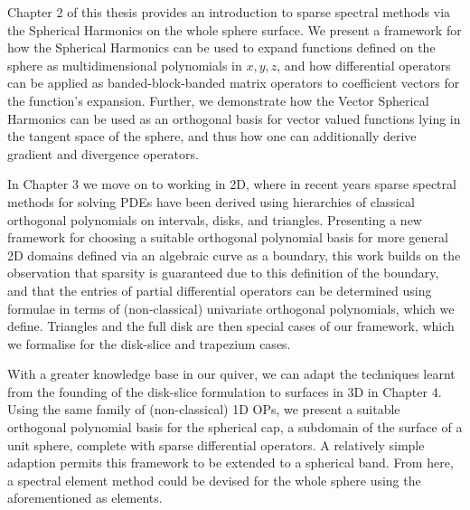 Chapter 2 of this thesis provides an introduction to sparse spectral methods via the Spherical Harmonics on the whole sphere surface. We present a framework for how the Spherical Harmonics can be used to expand functions defined on the sphere as multidimensional polynomials in $x, y, z$, and how differential operators can be applied as banded-block-banded matrix operators to coefficient vectors for the function's expansion. Further, we demonstrate how the Vector Spherical Harmonics can be used as an orthogonal basis for vector valued functions lying in the tangent space of the sphere, and thus how one can additionally derive gradient and divergence operators.

In Chapter 3 we move on to working in 2D, where in recent years sparse spectral methods for solving PDEs have been derived using hierarchies of classical orthogonal polynomials on intervals, disks, and triangles. Presenting a new framework for choosing a suitable orthogonal polynomial basis for more general 2D domains defined via an algebraic curve as a boundary, this work builds on the observation that sparsity is guaranteed due to this definition of the boundary, and that the entries of partial differential operators can be determined using formulae in terms of (non-classical) univariate orthogonal polynomials, which we define. Triangles and the full disk are then special cases of our framework, which we formalise for the disk-slice and trapezium cases.

With a greater knowledge base in our quiver, we can adapt the techniques learnt from the founding of the disk-slice formulation to surfaces in 3D in Chapter 4. Using the same family of (non-classical) 1D OPs, we present a suitable orthogonal polynomial basis for the spherical cap, a subdomain of the surface of a unit sphere, complete with sparse differential operators. A relatively simple adaption permits this framework to be extended to a spherical band. From here, a spectral element method could be devised for the whole sphere using the aforementioned as elements.

